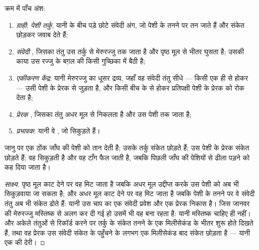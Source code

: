 \begin{proposition}[तनन प्रतिवर्त का परिपथ]\label{prop:g12:stretch-reflex:arc}
क्रम में पाँच अंश:
\begin{enumerate}
  \item \emph{ग्राही}: \emph{पेशी तर्कु}, यानी  के बीच पड़े छोटे
        संवेदी अंग, जो पेशी के तनने पर तन जाते हैं और संकेत छोड़कर जवाब
        देते हैं;
  \item \emph{संवेदी }, जिसका तंतु उस तर्कु से मेरुरज्जु तक जाता है
        और पृष्ठ मूल से भीतर घुसता है; उसकी  काया उस रज्जु के बग़ल की
        किसी गुच्छिका में बैठी है;
  \item \emph{एकीकरण केंद्र}: यानी मेरुरज्जु का धूसर द्रव्य, जहाँ वह
        संवेदी तंतु सीधे --- किसी एक ही  से होकर --- उसी पेशी
        के प्रेरक  से जुड़ता है, और किसी बीच के  से होकर
        प्रतिपक्षी पेशी के प्रेरक  को रोक देता है;
  \item \emph{प्रेरक }, जिसका तंतु अधर मूल से निकलता है और उस पेशी
        तक जाता है;
  \item \emph{प्रभावक}: यानी वे , जो सिकुड़ते हैं।
\end{enumerate}
जानु  पर एक ठोंक जाँघ की पेशी को तान देती है; उसके तर्कु संकेत छोड़ते
हैं; उस पेशी के प्रेरक  संकेत छोड़ते हैं; वह सिकुड़ती है और वह टाँग
फैल जाती है, जबकि पिछली जाँघ की पेशियों से ढीला पड़ने को कह दिया जाता है।
\end{proposition}
\begin{proof}[साक्ष्य]
पृष्ठ मूल काट देने पर वह  मिट जाता है जबकि अधर मूल उद्दीप्त करके उस
पेशी को अब भी सिकुड़वाया जा सकता है; और अधर मूल काट देने पर वह मिट जाता है
जबकि पेशी के तनने पर वे संवेदी तंतु अब भी संकेत ढोते हैं: यानी उस चाप का एक
संवेदी प्रवेश और एक प्रेरक निकास है। जिस जानवर की मेरुरज्जु मस्तिष्क से अलग
कर दी गई हो उसमें भी वह  बना रहता है: यानी मस्तिष्क चाहिए ही नहीं।
और अकेले तंतुओं से रिकॉर्ड करने पर तर्कु के संकेत तनने के एक मिलीसेकंड के
भीतर शुरू होते दिखते हैं, तथा वह प्रेरक  उस संवेदी संकेत के पहुँचने
के लगभग एक मिलीसेकंड बाद संकेत छोड़ता है --- यानी एक  की देरी।
\end{proof}

